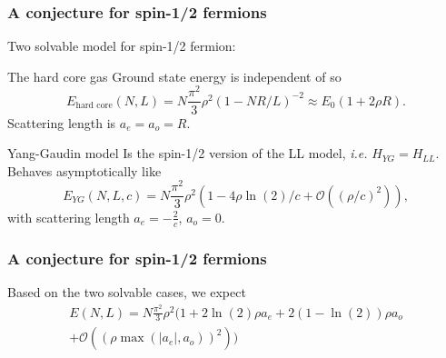 \documentclass{beamer}[10]
\newcommand{\abs}[1]{\left\lvert #1 \right\rvert}
\newcommand{\ie}{\emph{i.e.} }
\begin{document}
\begin{frame}
	\frametitle{A conjecture for spin-1/2 fermions}
	Two solvable model for spin-1/2 fermion:
	\begin{block}{The hard core gas}
		Ground state energy is independent of
		so \begin{equation}
		E_{\text{hard core}}(N,L)=N\frac{\pi^2}{3}\rho^2 (1-NR/L)^{-2}\approx E_0(1+2\rho R).
		\end{equation}
		Scattering length is $ a_e=a_o=R $.
	\end{block}
	\begin{block}{Yang-Gaudin model}
		Is the spin-1/2 version of the LL model, \ie $ H_{YG}=H_{LL} $.
		 Behaves asymptotically like
		 \begin{equation}
		 E_{YG}(N,L,c)=N\frac{\pi^2}{3}\rho^2\left(1-4\rho\ln(2)/c+\mathcal{O}\left((\rho/c)^2\right)\right),
		 \end{equation}
		 with scattering length $ a_e=-\frac{2}{c} $, $ a_o=0 $.
		\end{block}
\end{frame}
\begin{frame}
	\frametitle{A conjecture for spin-1/2 fermions}
	Based on the two solvable cases, we expect \small\begin{equation}
	\begin{aligned}
	E(N,L)=N\frac{\pi^2}{3}\rho^2\Big(1+2\ln(2)\rho a_e+2(1-\ln(2))\rho a_o\\+\mathcal{O}\left((\rho\max(\abs{a_e},a_o))^2\right)\Big)
	\end{aligned}
	\end{equation}
\end{frame}

\begin{frame}
\end{frame}
\end{document}
